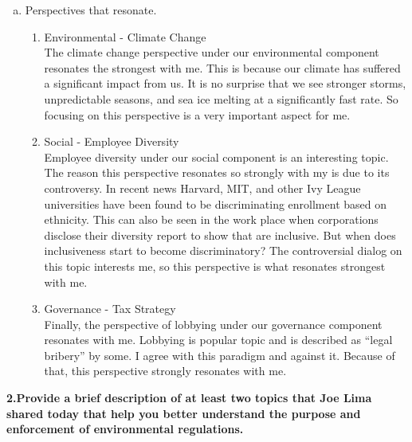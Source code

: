 \documentclass[12pt]{article}
\begin{document}
\begin{enumerate}[(a)]
\begin{enumerate}[(1)]
            
        \end{enumerate}
    
    \item Perspectives that resonate.
        
        \begin{enumerate}[(1)]
            \item Environmental - Climate Change \\
            The climate change perspective under our environmental component resonates the strongest with me. This is because our climate has suffered a significant impact from us. It is no surprise that we see stronger storms, unpredictable seasons, and sea ice melting at a significantly fast rate. So focusing on this perspective is a very important aspect for me. 
            
            \item Social - Employee Diversity \\
            Employee diversity under our social component is an interesting topic. The reason this perspective resonates so strongly with my is due to its controversy. In recent news Harvard, MIT, and other Ivy League universities have been found to be discriminating enrollment based on ethnicity. This can also be seen in the work place when corporations disclose their diversity report to show that are inclusive. But when does inclusiveness start to become discriminatory? The controversial dialog on this topic interests me, so this perspective is what resonates strongest with me. 
            
            \item Governance - Tax Strategy \\
            Finally, the perspective of lobbying under our governance component resonates with me. Lobbying is popular topic and is described as ``legal bribery'' by some. I agree with this paradigm and against it. Because of that, this perspective strongly resonates with me. 
                
        \end{enumerate}
    
\end{enumerate}

\textbf{2.Provide a brief description of at least two topics that Joe Lima shared today that help you better understand the purpose and enforcement of environmental regulations.} 
\end{document}
